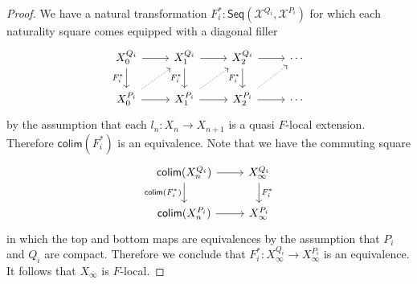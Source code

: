 \begin{proof}
We have a natural transformation $F_i^\ast : \mathsf{Seq}(\mathcal{X}^{Q_i},\mathcal{X}^{P_i})$ for which each naturality square comes equipped with a diagonal filler
\begin{equation*}
\begin{tikzcd}
X_0^{Q_i} \arrow[d,swap,"F_i^\ast"] \arrow[r] & X_1^{Q_i} \arrow[d,swap,"F_i^\ast"] \arrow[r] & X_2^{Q_i} \arrow[d,swap,"F_i^\ast"] \arrow[r] & \cdots \\
X_0^{P_i} \arrow[r] \arrow[ur,densely dotted] & X_1^{P_i} \arrow[r] \arrow[ur,densely dotted] & X_2^{P_i} \arrow[r] \arrow[ur,densely dotted] & \cdots
\end{tikzcd}
\end{equation*}
by the assumption that each $l_n:X_n\to X_{n+1}$ is a quasi $F$-local extension. Therefore $\mathsf{colim}(F_i^\ast)$ is an equivalence. Note that we have the commuting square
\begin{equation*}
\begin{tikzcd}
\mathsf{colim}(X_n^{Q_i}) \arrow[r] \arrow[d,swap,"\mathsf{colim}(F_i^\ast)"] & X_{\infty}^{Q_i} \arrow[d,"F_i^\ast"] \\
\mathsf{colim}(X_n^{P_i}) \arrow[r] & X_\infty^{P_i}
\end{tikzcd}
\end{equation*}
in which the top and bottom maps are equivalences by the assumption that $P_i$ and $Q_i$ are compact. Therefore we conclude that $F_i^\ast : X_\infty^{Q_i}\to X_\infty^{P_i}$ is an equivalence. It follows that $X_\infty$ is $F$-local.
\end{proof}

